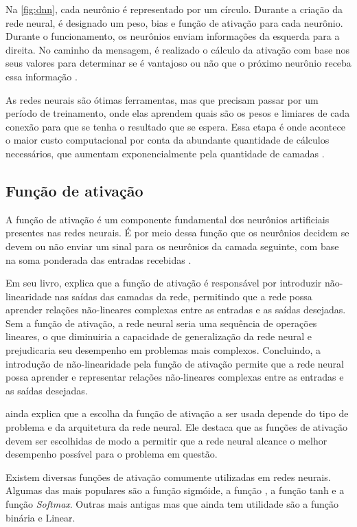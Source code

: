 Na \autoref{fig:dnn}, cada neurônio é representado por um círculo. 
Durante a criação da rede neural, é designado um peso, bias e função de ativação para cada neurônio. 
Durante o funcionamento, os neurônios enviam informações da esquerda para a direita. No caminho da mensagem, é realizado o cálculo da ativação com base nos seus valores para determinar se é vantajoso ou não que o próximo neurônio receba essa informação \cite{Haykin1998}.

As redes neurais são ótimas ferramentas, mas que precisam passar por um período de treinamento, onde elas aprendem quais são os pesos e limiares de cada conexão para que se tenha o resultado que se espera.
Essa etapa é onde acontece o maior custo computacional por conta da abundante quantidade de cálculos necessários, que aumentam exponencialmente pela quantidade de camadas \cite{lecun2015deep}.

\subsection{Função de ativação}

A função de ativação é um componente fundamental dos neurônios artificiais presentes nas redes neurais. 
É por meio dessa função que os neurônios decidem se devem ou não enviar um sinal para os neurônios da camada seguinte, com base na soma ponderada das entradas recebidas \cite{Goodfellow2016}.  

Em seu livro,  explica que a função de ativação é responsável por introduzir não-linearidade nas saídas das camadas da rede, permitindo que a rede possa aprender relações não-lineares complexas entre as entradas e as saídas desejadas.
Sem a função de ativação, a rede neural seria uma sequência de operações lineares, o que diminuiria a capacidade de generalização da rede neural e prejudicaria seu desempenho em problemas mais complexos.
Concluindo, a introdução de não-linearidade pela função de ativação permite que a rede neural possa aprender e representar relações não-lineares complexas entre as entradas e as saídas desejadas.

 ainda explica que a escolha da função de ativação a ser usada depende do tipo de problema e da arquitetura da rede neural. 
Ele destaca que as funções de ativação devem ser escolhidas de modo a permitir que a rede neural alcance o melhor desempenho possível para o problema em questão.

Existem diversas funções de ativação comumente utilizadas em redes neurais. 
Algumas das mais populares são a função sigmóide, a função , a função  tanh e a função \textit{Softmax}.
Outras mais antigas mas que ainda tem utilidade são a função binária e Linear.

